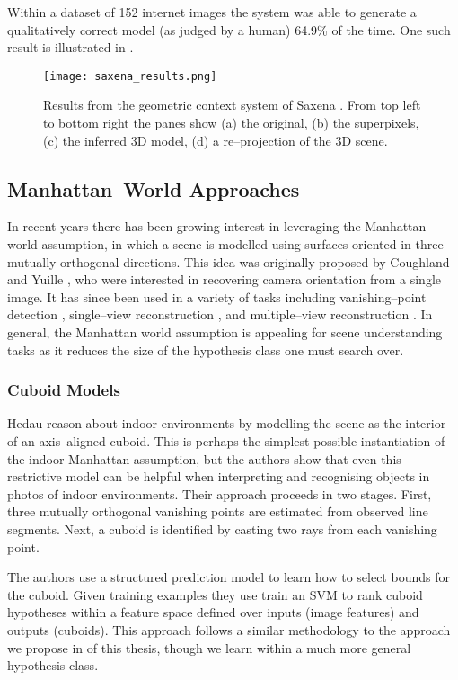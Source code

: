 Within a dataset of 152 internet images the system was able to
generate a qualitatively correct model (as judged by a human) 64.9\%
of the time. One such result is illustrated in .

\begin{figure}[tb]
\centering
\texttt{[image: saxena\_results.png]}
\caption{Results from the geometric context system of Saxena \etal
  \cite{Saxena09}. From top left to bottom right the panes show (a)
  the original, (b) the superpixels, (c) the inferred 3D model, (d) a
  re--projection of the 3D scene.}
\label{fig:saxena-result}
\end{figure}

\subsection{Manhattan--World Approaches}

In recent years there has been growing interest in leveraging the
Manhattan world assumption, in which a scene is modelled using
surfaces oriented in three mutually orthogonal directions. This idea
was originally proposed by Coughland and Yuille \cite{Coughlan99}, who
were interested in recovering camera orientation from a single
image. It has since been used in a variety of tasks including
vanishing--point detection \cite{Zhang02}, single--view reconstruction
\cite{Lee09,Flint10eccv}, and multiple--view reconstruction
\cite{Furukawa09,Flint11}. In general, the Manhattan world assumption
is appealing for scene understanding tasks as it reduces the size of
the hypothesis class one must search over.

\subsubsection{Cuboid Models}

Hedau \etal \cite{Hedau2009} reason about indoor environments by
modelling the scene as the interior of an axis--aligned cuboid. This
is perhaps the simplest possible instantiation of the indoor Manhattan
assumption, but the authors show that even this restrictive model can
be helpful when interpreting and recognising objects in photos of
indoor environments. Their approach proceeds in two stages. First,
three mutually orthogonal vanishing points are estimated from
observed line segments. Next, a cuboid is identified by casting two
rays from each vanishing point.

The authors use a structured prediction model to learn how to select
bounds for the cuboid. Given training examples they use train an SVM
to rank cuboid hypotheses within a feature space defined over inputs
(image features) and outputs (cuboids). This approach follows a
similar methodology to the approach we propose in 
of this thesis, though we learn within a much more general hypothesis
class.

